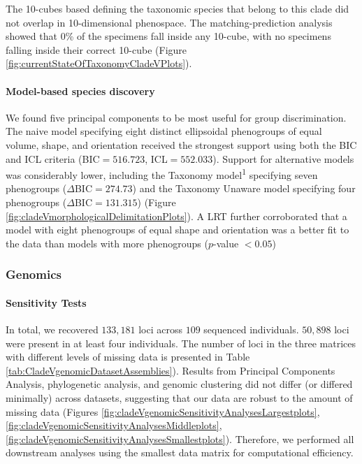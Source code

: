 \documentclass[
  11pt,
]{article}
\begin{document}
The 10-cubes based defining the taxonomic species that belong to this clade did not overlap in 10-dimensional phenospace. The matching-prediction analysis showed that \(0\)\% of the specimens fall inside any 10-cube, with no specimens falling inside their correct 10-cube (Figure \ref{fig:currentStateOfTaxonomyCladeVPlots}).

\hypertarget{model-based-species-discovery-8}{%
\paragraph{Model-based species discovery}\label{model-based-species-discovery-8}}

We found five principal components to be most useful for group discrimination. The naive model specifying eight distinct ellipsoidal phenogroups of equal volume, shape, and orientation received the strongest support using both the BIC and ICL criteria (BIC\(=516.723\), ICL\(=552.033\)). Support for alternative models was considerably lower, including the Taxonomy model\textsuperscript{1} specifying seven phenogroups (\(\Delta\)BIC\(=274.73\)) and the Taxonomy Unaware model specifying four phenogroups (\(\Delta\)BIC\(=131.315\)) (Figure \ref{fig:cladeVmorphologicalDelimitationPlots}). A LRT further corroborated that a model with eight phenogroups of equal shape and orientation was a better fit to the data than models with more phenogroups (\(p\)-value \(<0.05\))

\hypertarget{genomics-5}{%
\subsubsection{Genomics}\label{genomics-5}}

\hypertarget{sensitivity-tests-4}{%
\paragraph{Sensitivity Tests}\label{sensitivity-tests-4}}

In total, we recovered \(133,181\) loci across \(109\) sequenced individuals. \(50,898\) loci were present in at least four individuals. The number of loci in the three matrices with different levels of missing data is presented in Table \ref{tab:CladeVgenomicDatasetAssemblies}). Results from Principal Components Analysis, phylogenetic analysis, and genomic clustering did not differ (or differed minimally) across datasets, suggesting that our data are robust to the amount of missing data (Figures \ref{fig:cladeVgenomicSensitivityAnalysesLargestplots}, \ref{fig:cladeVgenomicSensitivityAnalysesMiddleplots}, \ref{fig:cladeVgenomicSensitivityAnalysesSmallestplots}). Therefore, we performed all downstream analyses using the smallest data matrix for computational efficiency.
\end{document}
